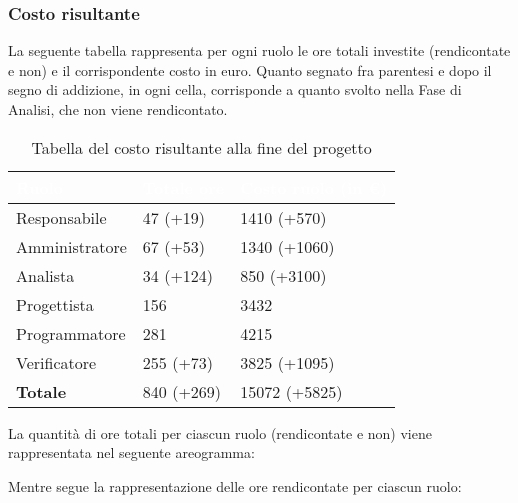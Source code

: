\clearpage

\subsubsection{Costo risultante}
La seguente tabella rappresenta per ogni ruolo le ore totali investite (rendicontate e non) e il corrispondente costo in euro. Quanto segnato fra parentesi e dopo il segno di addizione, in ogni cella, corrisponde a quanto svolto nella Fase di Analisi, che non viene rendicontato.
{
\renewcommand{\arraystretch}{2}
\begin{longtable}{ C{3cm} C{2cm} C{4cm}}
\caption{Tabella del costo risultante alla fine del progetto}\\

\textcolor{white}{\textbf{Ruolo}} & 
\textcolor{white}{\textbf{Totale ore}} & 
\textcolor{white}{\textbf{Costo ruolo (in \euro{})}}\\	
\endhead
        
Responsabile    &  47 (+19)  &  1410 (+570)  \\
Amministratore  &  67 (+53)  &  1340 (+1060) \\
Analista        &  34 (+124) &   850 (+3100) \\
Progettista     & 156        &  3432         \\
Programmatore   & 281        &  4215         \\
Verificatore    & 255 (+73)  &  3825 (+1095) \\
\textbf{Totale} & 840 (+269) & 15072 (+5825) \\	
        	
\end{longtable}
}

La quantità di ore totali per ciascun ruolo (rendicontate e non) viene rappresentata nel seguente areogramma:
\begin{center}
\end{center}

Mentre segue la rappresentazione delle ore rendicontate per ciascun ruolo:
\begin{center}
\end{center}